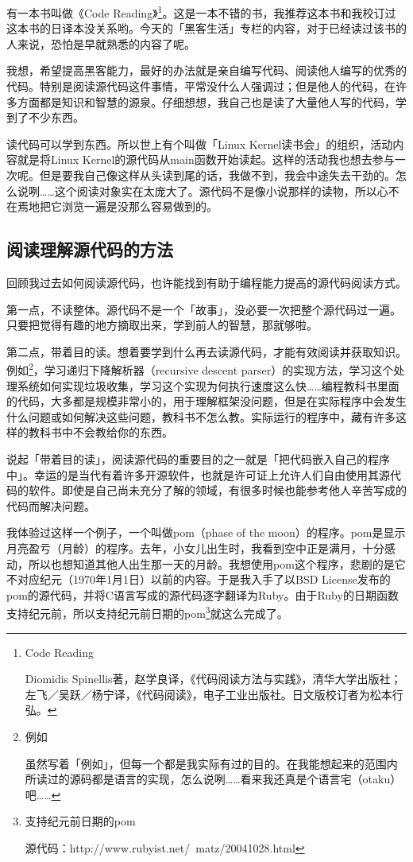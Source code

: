 \documentclass[a4paper,12pt]{article}
\begin{document}
有一本书叫做《Code Reading》\footnote{Code Reading

  Diomidis Spinellis著，赵学良译，《代码阅读方法与实践》，清华大学出版社；左飞／吴跃／杨宁译，《代码阅读》，电子工业出版社。日文版校订者为松本行弘。}。这是一本不错的书，我推荐这本书和我校订过这本书的日译本没关系哟。今天的「黑客生活」专栏的内容，对于已经读过该书的人来说，恐怕是早就熟悉的内容了呢。

我想，希望提高黑客能力，最好的办法就是亲自编写代码、阅读他人编写的优秀的代码。特别是阅读源代码这件事情，平常没什么人强调过；但是他人的代码，在许多方面都是知识和智慧的源泉。仔细想想，我自己也是读了大量他人写的代码，学到了不少东西。

读代码可以学到东西。所以世上有个叫做「Linux Kernel读书会」的组织，活动内容就是将Linux Kernel的源代码从main函数开始读起。这样的活动我也想去参与一次呢。但是要我自己像这样从头读到尾的话，我做不到，我会中途失去干劲的。怎么说咧……这个阅读对象实在太庞大了。源代码不是像小说那样的读物，所以心不在焉地把它浏览一遍是没那么容易做到的。

\subsection{阅读理解源代码的方法}

回顾我过去如何阅读源代码，也许能找到有助于编程能力提高的源代码阅读方式。

第一点，不读整体。源代码不是一个「故事」，没必要一次把整个源代码过一遍。只要把觉得有趣的地方摘取出来，学到前人的智慧，那就够啦。

第二点，带着目的读。想着要学到什么再去读源代码，才能有效阅读并获取知识。例如\footnote{例如

  虽然写着「例如」，但每一个都是我实际有过的目的。在我能想起来的范围内所读过的源码都是语言的实现，怎么说咧……看来我还真是个语言宅（otaku）吧……}，学习递归下降解析器（recursive descent parser）的实现方法，学习这个处理系统如何实现垃圾收集，学习这个实现为何执行速度这么快……编程教科书里面的代码，大多都是规模非常小的，用于理解框架没问题，但是在实际程序中会发生什么问题或如何解决这些问题，教科书不怎么教。实际运行的程序中，藏有许多这样的教科书中不会教给你的东西。

说起「带着目的读」，阅读源代码的重要目的之一就是「把代码嵌入自己的程序中」。幸运的是当代有着许多开源软件，也就是许可证上允许人们自由使用其源代码的软件。即使是自己尚未充分了解的领域，有很多时候也能参考他人辛苦写成的代码而解决问题。

我体验过这样一个例子，一个叫做pom（phase of the moon）的程序。pom是显示月亮盈亏（月龄）的程序。去年，小女儿出生时，我看到空中正是满月，十分感动，所以也想知道其他人出生那一天的月龄。我想使用pom这个程序，悲剧的是它不对应纪元（1970年1月1日）以前的内容。于是我入手了以BSD License发布的pom的源代码，并将C语言写成的源代码逐字翻译为Ruby。由于Ruby的日期函数支持纪元前，所以支持纪元前日期的pom\footnote{支持纪元前日期的pom

源代码：http://www.rubyist.net/~matz/20041028.html}就这么完成了。
\end{document}
